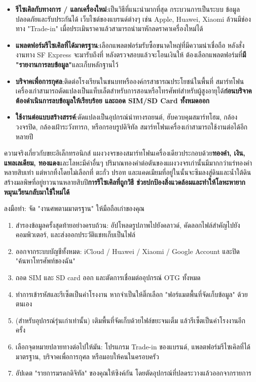 \begin{itemize}
  \item \textbf{รีไซเคิลกับทางการ / แลกเครื่องใหม่}:เป็นวิธีที่แนะนำมากที่สุด กระบวนการเป็นระบบ ข้อมูลปลอดภัยและรับประกันได้ เว็บไซต์ของแบรนด์ต่างๆ เช่น Apple, Huawei, Xiaomi ล้วนมีช่องทาง "Trade-in" เมื่อประเมินราคาแล้วสามารถนำมาหักลดราคาเครื่องใหม่ได้
  \item \textbf{แพลตฟอร์มรีไซเคิลที่ได้มาตรฐาน}:เลือกแพลตฟอร์มรับซื้อขนาดใหญ่ที่มีความน่าเชื่อถือ หลังสั่งงานทาง SF Express จะมารับถึงที่ หลังตรวจสอบแล้วจะโอนเงินให้ ต้องเลือกแพลตฟอร์มที่\textbf{มี "รายงานการลบข้อมูล"}และเก็บหลักฐานไว้
  \item \textbf{บริจาคเพื่อการกุศล}:ติดต่อโรงเรียนในชนบทหรือองค์กรสาธารณประโยชน์ในพื้นที่ สมาร์ทโฟนเครื่องเก่าสามารถดัดแปลงเป็นแท็บเล็ตสำหรับการสอนหรือโทรศัพท์สำหรับผู้สูงอายุได้\textbf{ก่อนบริจาคต้องดำเนินการลบข้อมูลให้เรียบร้อย และถอด SIM/SD Card ทั้งหมดออก}
  \item \textbf{ใช้งานต่อแบบสร้างสรรค์}:ดัดแปลงเป็นอุปกรณ์นำทางรถยนต์, ฮับควบคุมสมาร์ทโฮม, กล้องวงจรปิด, กล้องเฝ้าระวังทารก, หรือกรอบรูปดิจิทัล สมาร์ทโฟนเครื่องเก่าสามารถใช้งานต่อได้อีกหลายปี
\end{itemize}

\begin{tcbinfo}{ความจริงเกี่ยวกับขยะอิเล็กทรอนิกส์}
แผงวงจรของสมาร์ทโฟนเครื่องเดียวประกอบด้วย\textbf{ทองคำ, เงิน, แพลเลเดียม, ทองแดง}และโลหะมีค่าอื่นๆ ปริมาณทองคำต่อตันของแผงวงจรเก่านั้นมีมากกว่าแร่ทองคำหลายสิบเท่า แต่หากทิ้งโดยไม่เลือกที่ ตะกั่ว ปรอท และแคดเมียมที่อยู่ในนั้นจะซึมลงสู่ดินและน้ำใต้ดิน สร้างมลพิษที่อยู่ยาวนานหลายสิบปี\textbf{การรีไซเคิลที่ถูกวิธี ช่วยปกป้องสิ่งแวดล้อมและทำให้โลหะหายากหมุนเวียนกลับมาใช้ใหม่ได้}

\end{tcbinfo}

\begin{tcbpractice}{ลงมือทำ: จัด "งานศพตามมาตรฐาน" ให้มือถือเก่าของคุณ}
\begin{enumerate}
  \item สำรองข้อมูลครั้งสุดท้ายอย่างครบถ้วน: อัปโหลดรูปภาพไปยังคลาวด์, คัดลอกไฟล์สำคัญไปยังคอมพิวเตอร์, และส่งออกประวัติแชทเก็บเป็นไฟล์
  \item ออกจากระบบบัญชีทั้งหมด: iCloud / Huawei / Xiaomi / Google Account และปิด "ค้นหาโทรศัพท์ของฉัน"
  \item ถอด SIM และ SD card ออก และตัดการเชื่อมต่ออุปกรณ์ OTG ทั้งหมด
  \item ทำการเข้ารหัสและรีเซ็ตเป็นค่าโรงงาน หากจำเป็นให้ติ๊กเลือก "ฟอร์แมตพื้นที่จัดเก็บข้อมูล" ด้วยตนเอง
  \item (สำหรับอุปกรณ์รุ่นเก่าเท่านั้น) เติมพื้นที่จัดเก็บด้วยไฟล์ขยะจนเต็ม แล้วรีเซ็ตเป็นค่าโรงงานอีกครั้ง
  \item เลือกจุดหมายปลายทางต่อไปให้มัน: โปรแกรม Trade-in ของแบรนด์, แพลตฟอร์มรีไซเคิลที่ได้มาตรฐาน, บริจาคเพื่อการกุศล หรือมอบให้คนในครอบครัว
  \item อัปเดต "รายการมรดกดิจิทัล" ของคุณให้ซิงค์กัน โดยตัดอุปกรณ์ที่ปลดระวางแล้วออกจากรายการ
\end{enumerate}

\end{tcbpractice}

